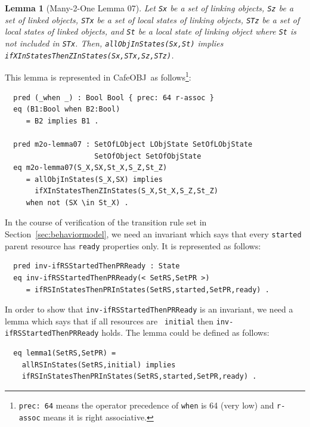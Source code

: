 \documentclass[12pt]{report}
\newtheorem{lemma}{Lemma}
\newcommand{\stt}[1]{{\small{\tt {#1}}}}
\newcommand{\cafeobj}{{\sf CafeOBJ}~}
\begin{document}
\begin{lemma}[Many-2-One Lemma 07]
  Let {\tt Sx} be a set of linking objects, {\tt Sz} be a set of
  linked objects, {\tt STx} be a set of local states of linking
  objects, {\tt STz} be a set of local states of linked objects, and
  {\tt St} be a local state of linking object where {\tt St} is not
  included in {\tt STx}. Then, \stt{allObjInStates(Sx,St)} implies
  \stt{ifXInStatesThenZInStates(Sx,STx,Sz,STz)}.
\end{lemma}
This lemma is represented in \cafeobj as follows\footnote{\stt{prec:~64} 
means the operator precedence of {\tt when} is 64 (very low) and 
{\tt r-assoc} means it is right associative.}:
\begin{verbatim}
  pred (_when _) : Bool Bool { prec: 64 r-assoc }
  eq (B1:Bool when B2:Bool)
     = B2 implies B1 .

  pred m2o-lemma07 : SetOfLObject LObjState SetOfLObjState 
                     SetOfObject SetOfObjState
  eq m2o-lemma07(S_X,SX,St_X,S_Z,St_Z)
     = allObjInStates(S_X,SX) implies 
       ifXInStatesThenZInStates(S_X,St_X,S_Z,St_Z)
     when not (SX \in St_X) .
\end{verbatim}
In the course of verification of the transition rule set in
Section~\ref{sec:behaviormodel}, we need an invariant which says that
every {\tt started} parent resource has {\tt ready} properties
only. It is represented as follows:
\begin{verbatim}
  pred inv-ifRSStartedThenPRReady : State
  eq inv-ifRSStartedThenPRReady(< SetRS,SetPR >)
     = ifRSInStatesThenPRInStates(SetRS,started,SetPR,ready) .
\end{verbatim}
In order to show that {\tt inv-ifRSStartedThenPRReady} is an
invariant, we need a lemma which says that if all resources are {\tt
  initial} then {\tt inv-ifRSStartedThenPRReady} holds.  The lemma
could be defined as follows:
\begin{verbatim}
  eq lemma1(SetRS,SetPR) =
    allRSInStates(SetRS,initial) implies
    ifRSInStatesThenPRInStates(SetRS,started,SetPR,ready) .
\end{verbatim}
\end{document}
